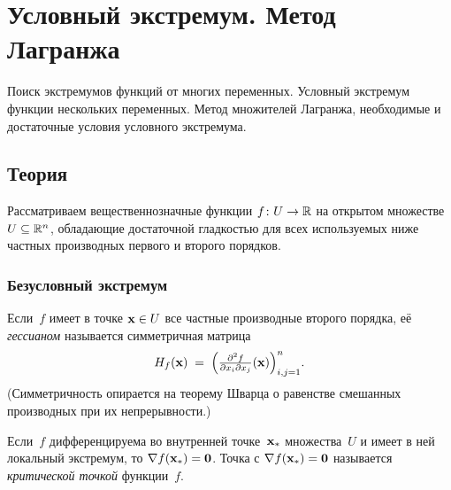 
\section{Условный экстремум. Метод Лагранжа}
\label{sec:1.1.11-conditional-extrema}

\begin{ticket}
Поиск экстремумов функций от многих переменных. Условный экстремум функции нескольких переменных. Метод множителей Лагранжа, необходимые и достаточные условия условного экстремума.
\end{ticket}

\subsection*{Теория}

Рассматриваем вещественнозначные функции $f \colon U \to \mathbb{R}$ на
открытом множестве $U \subseteq \mathbb{R}^n$, обладающие достаточной
гладкостью для всех используемых ниже частных производных первого и
второго порядков.

\subsubsection*{Безусловный экстремум}

\begin{definition}
\label{def:hessian}
Если~$f$ имеет в точке $\mathbf{x} \in U$ все частные производные
второго порядка, её \emph{гессианом} называется симметричная матрица
\[
  H_f(\mathbf{x}) \;=\; \Bigl(\tfrac{\partial^2 f}{\partial x_i \partial x_j}(\mathbf{x})\Bigr)_{i,j = 1}^{n}.
\]
(Симметричность опирается на теорему Шварца о равенстве смешанных
производных при их непрерывности.)
\end{definition}

\begin{theorem}
\label{thm:necessary-uncon}
Если~$f$ дифференцируема во внутренней точке~$\mathbf{x}_*$
множества~$U$ и имеет в ней локальный экстремум, то
$\nabla f(\mathbf{x}_*) = \mathbf{0}$. Точка с
$\nabla f(\mathbf{x}_*) = \mathbf{0}$ называется \emph{критической точкой}
функции~$f$.
\end{theorem}

